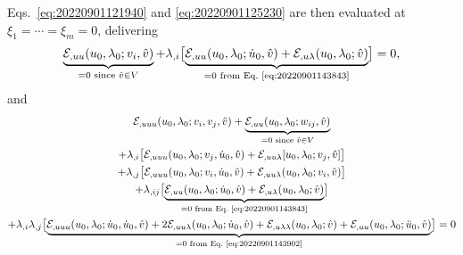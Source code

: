 \documentclass[12pt, final]{scrartcl}
\theoremstyle{definition}
\newcommand{\E}{\mathcal E}
\begin{document}
Eqs.~\eqref{eq:20220901121940} and \eqref{eq:20220901125230} are then evaluated
at $ξ_1 = \cdots = ξ_m = 0$, delivering
\begin{equation}
  \label{eq:20220901152056}
  \underbrace{\E_{,uu}(u_0, \lambda_0; v_i, \hat{v})}_{=0 \text{ since } \hat{v} \in V}
  + \lambda_{, i} \bigl[ \underbrace{\E_{,uu}(u_0, \lambda_0; \dot{u}_0, \hat{v}) +  \E_{,u\lambda}(u_0, \lambda_0; \hat{v})}_{ = 0 \text{ from Eq.~\eqref{eq:20220901143843}}} \bigr] = 0,
\end{equation}
and
\begin{equation}
  \label{eq:20220901152145}
  \begin{gathered}[b]
    \E_{,uuu}(u_0, \lambda_0; v_i , v_j, \hat{v}) + \underbrace{\E_{,uu}(u_0, \lambda_0; w_{ij}, \hat{v})}_{=0 \text{ since } \hat{v} \in V}\\
    +\lambda_{,i} \bigl[\E_{,uuu}(u_0, \lambda_0; v_j , \dot{u}_0, \hat{v}) + \E_{,uu\lambda}[u_0, \lambda_0; v_j, \hat{v}]\bigr]\\
    +\lambda_{,j} \bigl[\E_{,uuu}(u_0, \lambda_0; v_i , \dot{u}_0, \hat{v}) + \E_{,uu\lambda}(u_0, \lambda_0; v_i, \hat{v})\bigr]\\
    +\lambda_{,ij} \bigl[ \underbrace{\E_{,uu}(u_0, \lambda_0;  \dot{u}_0, \hat{v}) + \E_{,u\lambda}(u_0, \lambda_0; \hat{v})}_{ = 0 \text{ from Eq.~\eqref{eq:20220901143843}}} \bigr]\\
    +\lambda_{,i} \lambda_{,j}\bigl[ \underbrace{\E_{,uuu}(u_0, \lambda_0; \dot{u}_0 , \dot{u}_0, \hat{v}) + 2\E_{,uu\lambda}(u_0, \lambda_0; \dot{u}_0, \hat{v}) + \E_{,u\lambda\lambda}(u_0, \lambda_0; \hat{v}) + \E_{,uu}(u_0, \lambda_0; \ddot{u}_0, \hat{v})}_{ = 0 \text{ from Eq.~\eqref{eq:20220901143902}}} \bigr] = 0
  \end{gathered}
\end{equation}
\end{document}
